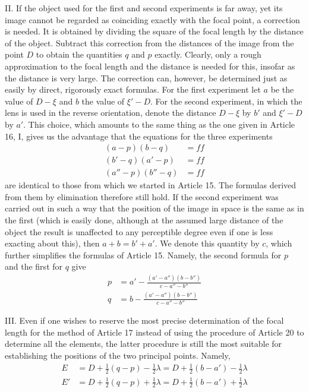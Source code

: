 II. If the object used for the first and second experiments is far away, yet its image cannot be regarded as coinciding exactly with the focal point, a correction is needed. It is obtained by dividing the square of the focal length by the distance of the object. Subtract this correction from the distances of the image from the point $D$ to obtain the quantities $q$ and $p$ exactly. Clearly, only a rough approximation to the focal length and the distance is needed for this, insofar as the distance is very large. The correction can, however, be determined just as easily by direct, rigorously exact formulas. For the first experiment let $a$ be the value of $D-\xi$ and $b$ the value of $\xi'-D$. For the second experiment, in which the lens is used in the reverse orientation, denote the distance $D-\xi$ by $b'$ and $\xi'-D$ by $a'$. This choice, which amounts to the same thing as the one given in Article 16, I, gives us the advantage that the equations for the three experiments
\[
\begin{aligned}
(a-p)(b-q)&=ff\\
(b'-q)(a'-p)&=ff\\
(a''-p)(b''-q)&=ff
\end{aligned}
\]
are identical to those from which we started in Article 15. The formulas derived from them by elimination therefore still hold. If the second experiment was carried out in such a way that the position of the image in space is the same as in the first (which is easily done, although at the assumed large distance of the object the result is unaffected to any perceptible degree even if one is less exacting about this), then $a+b=b'+a'$. We denote this quantity by $c$, which further simplifies the formulas of Article 15. Namely, the second formula for $p$ and the first for $q$ give
\[
\begin{aligned}
p&=a'-\frac{(a'-a'')(b-b'')}{c-a''-b''}\\
q&=b-\frac{(a'-a'')(b-b'')}{c-a''-b''}
\end{aligned}
\]

III. Even if one wishes to reserve the most precise determination of the focal length for the method of Article 17 instead of using the procedure of Article 20 to determine all the elements, the latter procedure is still the most suitable for establishing the positions of the two principal points. Namely,
\[
\begin{aligned}
E&=D+\tfrac12(q-p)-\tfrac12\lambda=D+\tfrac12(b-a')-\tfrac12\lambda\\
E'&=D+\tfrac12(q-p)+\tfrac12\lambda=D+\tfrac12(b-a')+\tfrac12\lambda
\end{aligned}
\]

